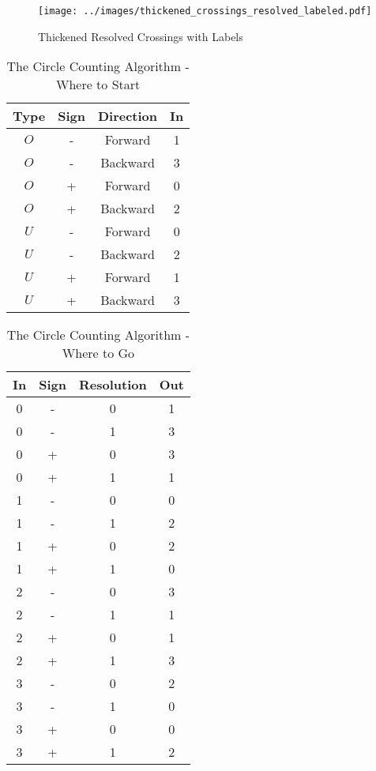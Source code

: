 \documentclass{article}
\theoremstyle{plain}
\begin{document}
        \begin{figure}
            \centering
            \texttt{[image: ../images/thickened\_crossings\_resolved\_labeled.pdf]}
            \caption{Thickened Resolved Crossings with Labels}
            \label{fig:thickened_crossings_resolved_labeled}
        \end{figure}
        \begin{table}
            \centering
            \begin{tabular}{c c c c}
                Type&Sign&Direction&In\\
                \hline
                $O$&-&Forward&1\\
                $O$&-&Backward&3\\
                $O$&+&Forward&0\\
                $O$&+&Backward&2\\
                \hline
                $U$&-&Forward&0\\
                $U$&-&Backward&2\\
                $U$&+&Forward&1\\
                $U$&+&Backward&3
            \end{tabular}
            \caption{The Circle Counting Algorithm - Where to Start}
            \label{tab:circle_counting_algorithm_where_start}
        \end{table}
        \begin{table}
            \centering
            \begin{tabular}{c c c c}
                In&Sign&Resolution&Out\\
                \hline
                0&-&0&1\\
                0&-&1&3\\
                0&+&0&3\\
                0&+&1&1\\
                \hline
                1&-&0&0\\
                1&-&1&2\\
                1&+&0&2\\
                1&+&1&0\\
                \hline
                2&-&0&3\\
                2&-&1&1\\
                2&+&0&1\\
                2&+&1&3\\
                \hline
                3&-&0&2\\
                3&-&1&0\\
                3&+&0&0\\
                3&+&1&2
            \end{tabular}
            \caption{The Circle Counting Algorithm - Where to Go}
            \label{tab:circle_counting_algorithm_where_go}
        \end{table}
\end{document}
